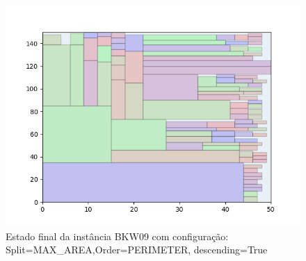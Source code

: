 \begin{figure}[H]
    \centering
    \caption[]{Estado final da instância BKW09 com configuração: Split=MAX_AREA,Order=PERIMETER, descending=True}
    \label{fig:bkw09-max_area-perimeter-true}
    \includegraphics[scale=0.5]{output/figures/bkw/bkw09/max_area/perimeter/true/000}
\end{figure}